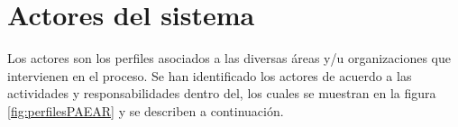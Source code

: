 \section{Actores del sistema}\label{sec:Comportamiento:ActoresSistema}

Los actores son los perfiles asociados a las diversas áreas y/u organizaciones que intervienen en el proceso. Se han identificado los actores de acuerdo a las actividades y responsabilidades dentro del, los cuales se muestran en la figura \ref{fig:perfilesPAEAR} y se describen a continuación.



